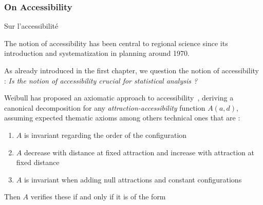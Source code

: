 


\subsubsection{On Accessibility}{Sur l'accessibilité}


The notion of accessibility has been central to regional science since its introduction and systematization in planning around 1970. 





As already introduced in the first chapter, we question the notion of accessibility : \textit{Is the notion of accessibility crucial for statistical analysis ?}

\medskip


Weibull has proposed an axiomatic approach to accessibility~\cite{weibull1976axiomatic}, deriving a canonical decomposition for any \emph{attraction-accessibility} function $A(a,d)$, assuming expected thematic axioms among others technical ones that are :
\begin{enumerate}
\item $A$ is invariant regarding the order of the configuration
\item $A$ decrease with distance at fixed attraction and increase with attraction at fixed distance
\item $A$ is invariant when adding null attractions and constant configurations
\end{enumerate}
Then $A$ verifies these if and only if it is of the form

